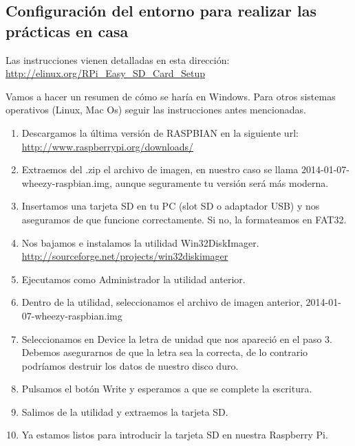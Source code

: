 \subsection{Configuración del entorno para realizar las prácticas en casa}

Las instrucciones vienen detalladas en esta dirección:\newline
\textcolor{blue}{
  \href{http://elinux.org/RPi\_Easy\_SD\_Card\_Setup}
  {http://elinux.org/RPi\_Easy\_SD\_Card\_Setup}}

Vamos a hacer un resumen de cómo se haría en Windows. Para otros
sistemas operativos (Linux, Mac Os) seguir las instrucciones antes mencionadas.

\begin{enumerate}
  \item Descargamos la última versión de RASPBIAN en la siguiente url: \newline
\hspace{2.5cm}
\textcolor{blue}{
  \href{http://www.raspberrypi.org/downloads/}
  {http://www.raspberrypi.org/downloads/}}
  \item Extraemos del .zip el archivo de imagen, en nuestro caso se llama
        2014-01-07-wheezy-raspbian.img, aunque seguramente tu versión será más moderna.
  \item Insertamos una tarjeta SD en tu PC (slot SD o adaptador USB) y nos aseguramos de que
        funcione correctamente. Si no, la formateamos en FAT32.
  \item Nos bajamos e instalamos la utilidad Win32DiskImager. \newline
\hspace{2.5cm}
\textcolor{blue}{
  \href{http://sourceforge.net/projects/win32diskimager}
  {http://sourceforge.net/projects/win32diskimager}}
  \item Ejecutamos como Administrador la utilidad anterior.
  \item Dentro de la utilidad, seleccionamos el archivo de imagen anterior,
        2014-01-07-wheezy-raspbian.img
  \item Seleccionamos en Device la letra de unidad que nos apareció en el paso 3.
        Debemos asegurarnos de que la letra sea la correcta, de lo contrario
        podríamos destruir los datos de nuestro disco duro.
  \item Pulsamos el botón Write y esperamos a que se complete la escritura.
  \item Salimos de la utilidad y extraemos la tarjeta SD.
  \item Ya estamos listos para introducir la tarjeta SD en nuestra Raspberry Pi.
\end{enumerate}

